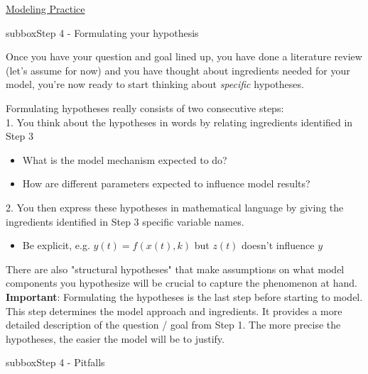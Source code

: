\begin{textbox}{\href{https://compneuro.neuromatch.io/projects/modelingsteps/ModelingSteps_5through10.html}{Modeling Practice } }

\begin{subbox}{subbox}{Step 4 - Formulating your hypothesis  }
\scriptsize

Once you have your question and goal lined up, you have done a literature review (let's assume for now) and you have thought about ingredients needed for your model, you're now ready to start thinking about \textit{specific} hypotheses.

Formulating hypotheses really consists of two consecutive steps:\\



1.   You think about the hypotheses in words by relating ingredients identified in Step 3
\begin{itemize}
    \item 
       What is the model mechanism expected to do? 
          \item  How are different parameters expected to influence model results?
      \end{itemize}

2.   You then express these hypotheses in mathematical language by giving the ingredients identified in Step 3 specific variable names. 
\begin{itemize}
         \item  Be explicit, e.g. $y(t)=f(x(t),k)$ but $z(t)$ doesn’t influence $y$
          \end{itemize}



There are also "structural hypotheses" that make assumptions on what model components you hypothesize will be crucial to capture the phenomenon at hand.\\ 

\textbf{Important}: Formulating the hypotheses is the last step before starting to model. This step determines the model approach and ingredients. It provides a more detailed description of the question / goal from Step 1. The more precise the hypotheses, the easier the model will be to justify. 
  \end{subbox}
\begin{subbox}{subbox}{Step 4 - Pitfalls }
\scriptsize


\end{subbox}
\end{textbox}
